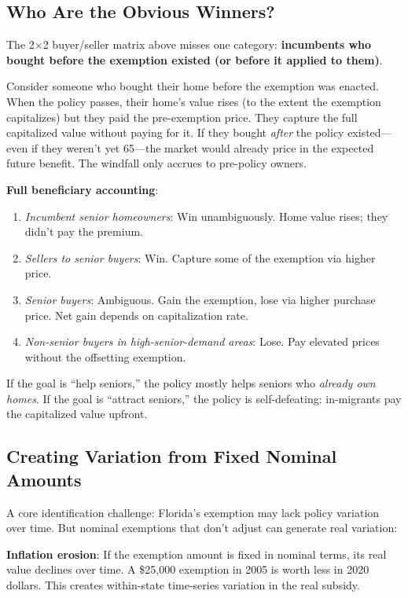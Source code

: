 \documentclass[11pt]{article}
\begin{document}
\subsection{Who Are the Obvious Winners?}

The 2$\times$2 buyer/seller matrix above misses one category: \textbf{incumbents who bought before the exemption existed (or before it applied to them)}.

Consider someone who bought their home before the exemption was enacted. When the policy passes, their home's value rises (to the extent the exemption capitalizes) but they paid the pre-exemption price. They capture the full capitalized value without paying for it. If they bought \textit{after} the policy existed---even if they weren't yet 65---the market would already price in the expected future benefit. The windfall only accrues to pre-policy owners.

\textbf{Full beneficiary accounting}:
\begin{enumerate}
    \item \textit{Incumbent senior homeowners}: Win unambiguously. Home value rises; they didn't pay the premium.
    \item \textit{Sellers to senior buyers}: Win. Capture some of the exemption via higher price.
    \item \textit{Senior buyers}: Ambiguous. Gain the exemption, lose via higher purchase price. Net gain depends on capitalization rate.
    \item \textit{Non-senior buyers in high-senior-demand areas}: Lose. Pay elevated prices without the offsetting exemption.
\end{enumerate}

If the goal is ``help seniors,'' the policy mostly helps seniors who \textit{already own homes}. If the goal is ``attract seniors,'' the policy is self-defeating: in-migrants pay the capitalized value upfront.

\subsection{Creating Variation from Fixed Nominal Amounts}

A core identification challenge: Florida's exemption may lack policy variation over time. But nominal exemptions that don't adjust can generate real variation:

\textbf{Inflation erosion}: If the exemption amount is fixed in nominal terms, its real value declines over time. A \$25,000 exemption in 2005 is worth less in 2020 dollars. This creates within-state time-series variation in the real subsidy.
\end{document}
